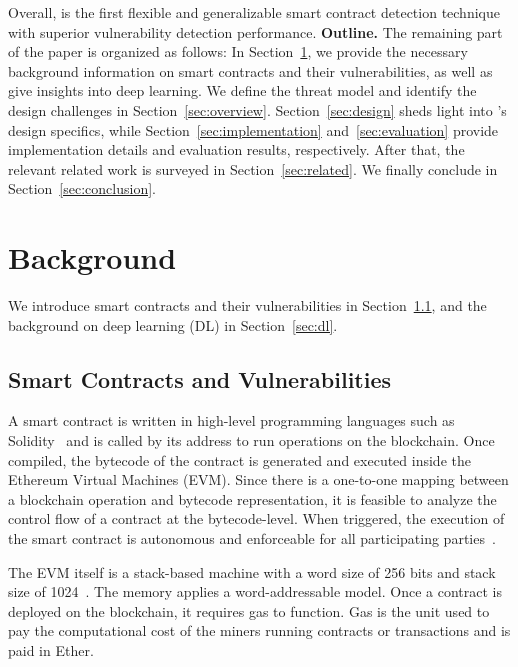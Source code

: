 Overall, \sys{} is the first flexible and generalizable smart contract detection technique with superior vulnerability detection performance.
\vspace{0.1em}
\noindent\textbf{Outline.} The remaining part of the paper is organized as follows: In Section~\ref{sec:background}, we provide the necessary background information on smart contracts and their vulnerabilities, as well as give insights into deep learning. 
We define the threat model and identify the design challenges in Section~\ref{sec:overview}.
Section~\ref{sec:design} sheds light into \sys{}'s design specifics, while Section~\ref{sec:implementation} and~\ref{sec:evaluation} provide implementation details and evaluation results, respectively. After that, the relevant related work is surveyed in Section~\ref{sec:related}. We finally conclude in Section~\ref{sec:conclusion}.  \vspace{-0.5em}
\section{Background}
\label{sec:background}
We introduce smart contracts and their vulnerabilities in Section~\ref{sec:smart_contracts}, and the background on deep learning (DL) in Section~\ref{sec:dl}.

 \vspace{-0.5em}
\subsection{Smart Contracts and Vulnerabilities}
\label{sec:smart_contracts}
\vspace{-0.2em}
A smart contract is written in high-level programming languages such as Solidity~\cite{solidity} and is called by its address to run operations on the blockchain.
Once compiled, the bytecode of the contract is generated and executed inside the Ethereum Virtual Machines (EVM). 
Since there is a one-to-one mapping between a blockchain operation and bytecode representation, it is feasible to analyze the control flow of a contract at the bytecode-level. When triggered, the execution of the smart contract is autonomous and enforceable for all participating parties~\cite{ethereum-background-04}. 

The EVM itself is a stack-based machine with a word size of 256 bits and stack size of 1024~\cite{ethereum-yellowpaper}. The memory applies a word-addressable model. Once a contract is deployed on the blockchain, it requires gas to function. Gas is the unit used to pay the computational cost of the miners running contracts or transactions and is paid in Ether.


